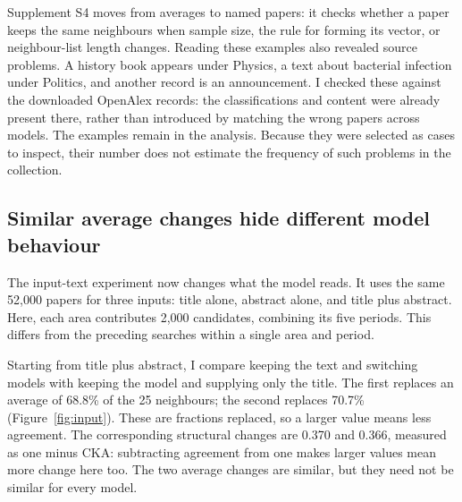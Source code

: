 \documentclass[12pt]{article}
\begin{document}
Supplement S4 moves from averages to named papers: it checks whether a paper keeps the same neighbours when sample size, the rule for forming its vector, or neighbour-list length changes. Reading these examples also revealed source problems. A history book appears under Physics, a text about bacterial infection under Politics, and another record is an announcement. I checked these against the downloaded OpenAlex records: the classifications and content were already present there, rather than introduced by matching the wrong papers across models. The examples remain in the analysis. Because they were selected as cases to inspect, their number does not estimate the frequency of such problems in the collection.

\FloatBarrier
\subsection{Similar average changes hide different model behaviour}
The input-text experiment now changes what the model reads. It uses the same 52,000 papers for three inputs: title alone, abstract alone, and title plus abstract. Here, each area contributes 2,000 candidates, combining its five periods. This differs from the preceding searches within a single area and period.

Starting from title plus abstract, I compare keeping the text and switching models with keeping the model and supplying only the title. The first replaces an average of 68.8\% of the 25 neighbours; the second replaces 70.7\% (Figure~\ref{fig:input}). These are fractions replaced, so a larger value means less agreement. The corresponding structural changes are 0.370 and 0.366, measured as one minus CKA: subtracting agreement from one makes larger values mean more change here too. The two average changes are similar, but they need not be similar for every model.
\end{document}
